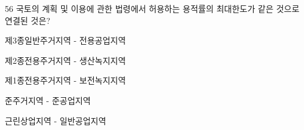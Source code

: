 \begin{question}{56}
국토의 계획 및 이용에 관한 법령에서 허용하는 용적률의 최대한도가 같은 것으로 연결된 것은?
\begin{choices}
  \item 제3종일반주거지역 - 전용공업지역
  \item 제2종전용주거지역 - 생산녹지지역
  \item 제1종전용주거지역 - 보전녹지지역
  \item 준주거지역 - 준공업지역
  \item 근린상업지역 - 일반공업지역
\end{choices}
\end{question}
